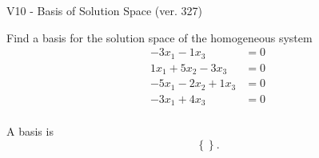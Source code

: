 \begin{exercise}
  \begin{exerciseTitle}V10 - Basis of Solution Space (ver. 327)\end{exerciseTitle}
  \begin{exerciseStatement}
    Find a basis for the solution space of the homogeneous system 
\begin{align*}
 -3 x_ 1 -1 x_ 3 &= 0  \\ 
  1 x_ 1 + 5 x_ 2 -3 x_ 3 &= 0  \\ 
  -5 x_ 1 -2 x_ 2 + 1 x_ 3 &= 0  \\ 
  -3 x_ 1 + 4 x_ 3 &= 0  \\ 
 \end{align*}


 
  \end{exerciseStatement}

  \begin{exerciseAnswer}
   A basis is   
\[\left\{\right\}.\]

  


  \end{exerciseAnswer}
\end{exercise}